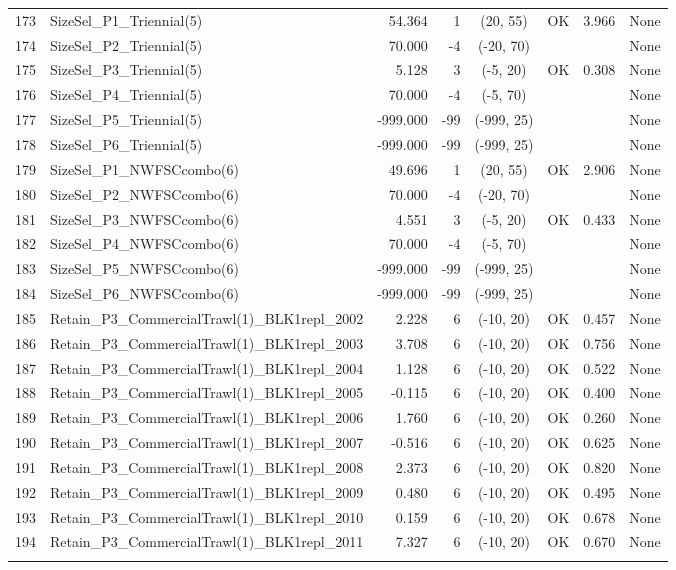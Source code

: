 \documentclass[12pt,]{article}
\begin{document}
\begin{landscape}
\begin{longtable}{rlrrcccl}
  173 & SizeSel\_P1\_Triennial(5) & 54.364 & 1 & (20, 55) & OK & 3.966 & None \\ 
  174 & SizeSel\_P2\_Triennial(5) & 70.000 & -4 & (-20, 70) &  &  & None \\ 
  175 & SizeSel\_P3\_Triennial(5) & 5.128 & 3 & (-5, 20) & OK & 0.308 & None \\ 
  176 & SizeSel\_P4\_Triennial(5) & 70.000 & -4 & (-5, 70) &  &  & None \\ 
  177 & SizeSel\_P5\_Triennial(5) & -999.000 & -99 & (-999, 25) &  &  & None \\ 
  178 & SizeSel\_P6\_Triennial(5) & -999.000 & -99 & (-999, 25) &  &  & None \\ 
  179 & SizeSel\_P1\_NWFSCcombo(6) & 49.696 & 1 & (20, 55) & OK & 2.906 & None \\ 
  180 & SizeSel\_P2\_NWFSCcombo(6) & 70.000 & -4 & (-20, 70) &  &  & None \\ 
  181 & SizeSel\_P3\_NWFSCcombo(6) & 4.551 & 3 & (-5, 20) & OK & 0.433 & None \\ 
  182 & SizeSel\_P4\_NWFSCcombo(6) & 70.000 & -4 & (-5, 70) &  &  & None \\ 
  183 & SizeSel\_P5\_NWFSCcombo(6) & -999.000 & -99 & (-999, 25) &  &  & None \\ 
  184 & SizeSel\_P6\_NWFSCcombo(6) & -999.000 & -99 & (-999, 25) &  &  & None \\ 
  185 & Retain\_P3\_CommercialTrawl(1)\_BLK1repl\_2002 & 2.228 & 6 & (-10, 20) & OK & 0.457 & None \\ 
  186 & Retain\_P3\_CommercialTrawl(1)\_BLK1repl\_2003 & 3.708 & 6 & (-10, 20) & OK & 0.756 & None \\ 
  187 & Retain\_P3\_CommercialTrawl(1)\_BLK1repl\_2004 & 1.128 & 6 & (-10, 20) & OK & 0.522 & None \\ 
  188 & Retain\_P3\_CommercialTrawl(1)\_BLK1repl\_2005 & -0.115 & 6 & (-10, 20) & OK & 0.400 & None \\ 
  189 & Retain\_P3\_CommercialTrawl(1)\_BLK1repl\_2006 & 1.760 & 6 & (-10, 20) & OK & 0.260 & None \\ 
  190 & Retain\_P3\_CommercialTrawl(1)\_BLK1repl\_2007 & -0.516 & 6 & (-10, 20) & OK & 0.625 & None \\ 
  191 & Retain\_P3\_CommercialTrawl(1)\_BLK1repl\_2008 & 2.373 & 6 & (-10, 20) & OK & 0.820 & None \\ 
  192 & Retain\_P3\_CommercialTrawl(1)\_BLK1repl\_2009 & 0.480 & 6 & (-10, 20) & OK & 0.495 & None \\ 
  193 & Retain\_P3\_CommercialTrawl(1)\_BLK1repl\_2010 & 0.159 & 6 & (-10, 20) & OK & 0.678 & None \\ 
  194 & Retain\_P3\_CommercialTrawl(1)\_BLK1repl\_2011 & 7.327 & 6 & (-10, 20) & OK & 0.670 & None \\ 
   \hline
\hline
\label{tab:model_params}
\end{longtable}
\end{landscape}
\end{document}
